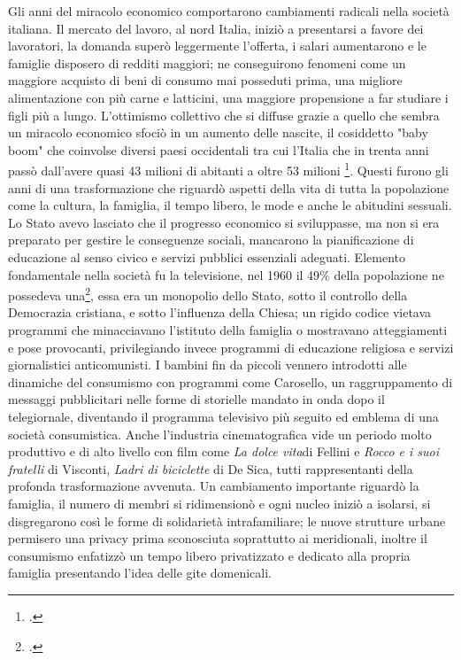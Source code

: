 Gli anni del miracolo economico comportarono cambiamenti radicali nella società italiana.
Il mercato del lavoro, al nord Italia, iniziò a presentarsi a favore dei lavoratori, la domanda superò leggermente l'offerta, i salari aumentarono e le famiglie disposero di redditi maggiori; ne conseguirono fenomeni come un maggiore acquisto di beni di consumo mai posseduti prima, una migliore alimentazione con più carne e latticini, una maggiore propensione a far studiare i figli più a lungo.
L'ottimismo collettivo che si diffuse grazie a quello che sembra un miracolo economico sfociò in un aumento delle nascite, il cosiddetto "baby boom" che coinvolse diversi paesi occidentali tra cui l'Italia che in trenta anni passò dall'avere quasi 43 milioni di abitanti a oltre 53 milioni \footcite{Banti}.
Questi furono gli anni di una trasformazione che riguardò aspetti della vita di tutta la popolazione come la cultura, la famiglia, il tempo libero, le mode e anche le abitudini sessuali.
Lo Stato avevo lasciato che il progresso economico si sviluppasse, ma non si era preparato per gestire le conseguenze sociali, mancarono la pianificazione di educazione al senso civico e servizi pubblici essenziali adeguati.
Elemento fondamentale nella società fu la televisione, nel 1960 il 49\% della popolazione ne possedeva una\footcite{storia}, essa era un monopolio dello Stato, sotto il controllo della Democrazia cristiana, e sotto l'influenza della Chiesa; un rigido codice vietava programmi che minacciavano l'istituto della famiglia o mostravano atteggiamenti e pose provocanti, privilegiando invece programmi di educazione religiosa e servizi giornalistici anticomunisti.
I bambini fin da piccoli vennero introdotti alle dinamiche del consumismo con programmi come Carosello, un raggruppamento di messaggi pubblicitari nelle forme di storielle mandato in onda dopo il telegiornale, diventando il programma televisivo più seguito ed emblema di una società consumistica.
Anche l'industria cinematografica vide un periodo molto produttivo e di alto livello con film come \textit{La dolce vita}di Fellini e \textit{Rocco e i suoi fratelli} di Visconti, \textit{Ladri di biciclette} di De Sica, tutti rappresentanti della profonda trasformazione avvenuta.
Un cambiamento importante riguardò la famiglia, il numero di membri si ridimensionò e ogni nucleo iniziò a isolarsi, si disgregarono così le forme di solidarietà intrafamiliare; le nuove strutture urbane permisero una privacy prima sconosciuta soprattutto ai meridionali, inoltre il consumismo enfatizzò un tempo libero privatizzato e dedicato alla propria famiglia presentando l'idea delle gite domenicali.
